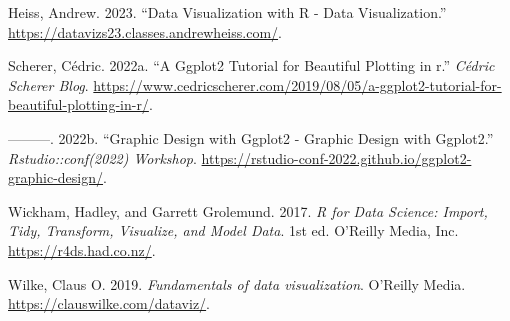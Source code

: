 \documentclass[
  letterpaper,
  DIV=11,
  numbers=noendperiod]{scrartcl}
\newlength{\cslhangindent}
\newlength{\cslentryspacingunit} %
\newenvironment{CSLReferences}[2] %
 {%
  \setlength{\parindent}{0pt}
  \ifodd #1
  \let\oldpar\par
  \def\par{\hangindent=\cslhangindent\oldpar}
  \fi
  \setlength{\parskip}{#2\cslentryspacingunit}
 }%
 {}
\begin{document}
\hypertarget{refs}{}
\begin{CSLReferences}{1}{0}
\leavevmode{}%
Heiss, Andrew. 2023. {``{D}ata {V}isualization with {R} - {D}ata
{V}isualization.''} \url{https://datavizs23.classes.andrewheiss.com/}.

\leavevmode{}%
Scherer, Cédric. 2022a. {``A Ggplot2 Tutorial for Beautiful Plotting in
r.''} \emph{Cédric Scherer Blog}.
\url{https://www.cedricscherer.com/2019/08/05/a-ggplot2-tutorial-for-beautiful-plotting-in-r/}.

\leavevmode{}%
---------. 2022b. {``{G}raphic {D}esign with Ggplot2 - {G}raphic
{D}esign with Ggplot2.''} \emph{Rstudio::conf(2022) Workshop}.
\url{https://rstudio-conf-2022.github.io/ggplot2-graphic-design/}.

\leavevmode{}%
Wickham, Hadley, and Garrett Grolemund. 2017. \emph{R for Data Science:
Import, Tidy, Transform, Visualize, and Model Data}. 1st ed. O'Reilly
Media, Inc. \url{https://r4ds.had.co.nz/}.

\leavevmode{}%
Wilke, Claus O. 2019. \emph{{Fundamentals of data visualization}}.
{O'Reilly Media}. \url{https://clauswilke.com/dataviz/}.

\end{CSLReferences}
\end{document}
